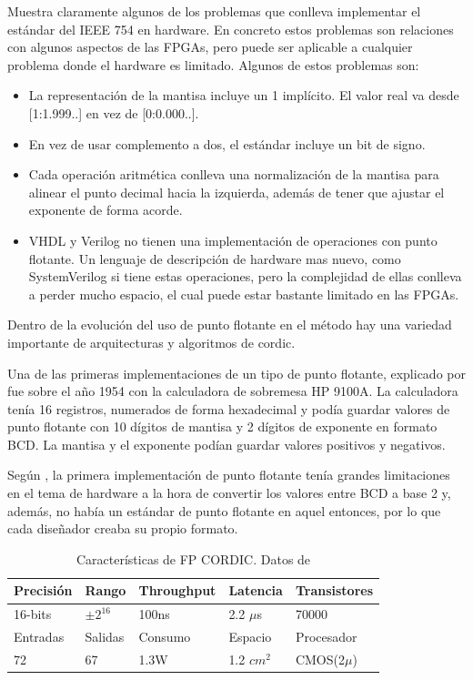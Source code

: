\cite{parker_abstract_2011} Muestra claramente algunos de los problemas que conlleva implementar el estándar del IEEE 754 en hardware. En concreto estos problemas son relaciones con algunos aspectos de las FPGAs, pero puede ser aplicable a cualquier problema donde el hardware es limitado. Algunos de estos problemas son:

\begin{itemize}
	\item La representación de la mantisa incluye un 1 implícito. El valor real va desde [1:1.999..] en vez de [0:0.000..]. 
	\item En vez de usar complemento a dos, el estándar incluye un bit de signo.
	\item Cada operación aritmética conlleva una normalización de la mantisa para alinear el punto decimal hacia la izquierda, además de tener que ajustar el exponente de forma acorde.
	\item VHDL y Verilog no tienen una implementación de operaciones con punto flotante. Un lenguaje de descripción de hardware mas nuevo, como SystemVerilog si tiene estas operaciones, pero la complejidad de ellas conlleva a perder mucho espacio, el cual puede estar bastante limitado en las FPGAs.
\end{itemize}

Dentro de la evolución del uso de punto flotante en el método hay una variedad importante de arquitecturas y algoritmos de \gls{cordic}.

Una de las primeras implementaciones de un tipo de punto flotante, explicado por \cite{leibson_9100_2005} fue sobre el año 1954 con la calculadora de sobremesa HP 9100A. La calculadora tenía 16 registros, numerados de forma hexadecimal y podía guardar valores de punto flotante con 10 dígitos de mantisa y 2 dígitos de exponente en formato BCD. La mantisa y el exponente podían guardar valores positivos y negativos.

Según \cite{walther_unified_1971}, la primera implementación de punto flotante tenía grandes limitaciones en el tema de hardware a la hora de convertir los valores entre BCD a base 2 y, además, no había un estándar de punto flotante en aquel entonces, por lo que cada diseñador creaba su propio formato.

\begin{table}[]
	\centering
	\begin{tabular}{|l|l|l|l|l|}
	\hline
		Precisión & Rango                 & Throughput & Latencia                  & Transistores \\ \hline
		16-bits   & $\pm2^{16}$ & 100ns      & 2.2 $\mu$s                     & 70000        \\
\hline
		Entradas  & Salidas               & Consumo    & Espacio                   & Procesador   \\ \hline
		72        & 67                    & 1.3W       & 1.2 $cm^2$ & CMOS(2$\mu$) \\ \hline   
	\end{tabular}
	\caption{Características de FP CORDIC. Datos de \cite{de_lange_optimal_1988}}
	\label{table:FP_CORDIC_feature}
\end{table}

